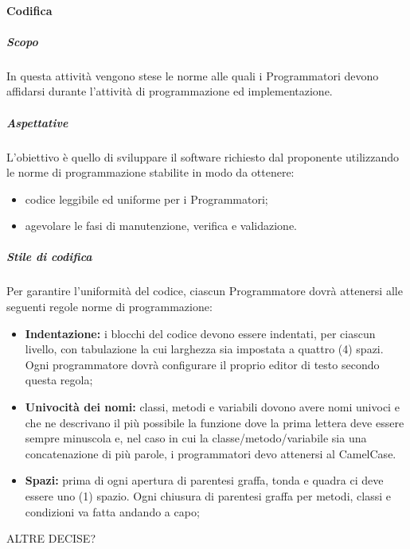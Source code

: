 			\paragraph{Codifica}
				\subparagraph{Scopo}	
					In questa attività vengono stese le norme alle quali i Programmatori devono affidarsi durante l’attività di  programmazione ed implementazione.
				\subparagraph{Aspettative}
					 L’obiettivo è quello di sviluppare il software richiesto dal proponente utilizzando le norme di programmazione stabilite in modo da ottenere:
					 	\begin{itemize}
					 	\item codice leggibile ed uniforme per i Programmatori;
					 	\item agevolare le fasi di manutenzione, verifica e validazione.
					 \end{itemize} 
				 \subparagraph{Stile di codifica}
				 	Per garantire l'uniformità del codice, ciascun Programmatore dovrà attenersi alle seguenti regole norme di programmazione: 
					\begin{itemize}
						\item \textbf{Indentazione:} i blocchi del codice devono essere indentati, per ciascun livello, con tabulazione la cui larghezza sia impostata a quattro (4) spazi. Ogni programmatore dovrà configurare il proprio editor di testo secondo questa regola;
						\item \textbf{Univocità dei nomi:} classi, metodi e variabili dovono avere nomi univoci e che ne descrivano il più possibile la funzione dove la prima lettera deve essere sempre minuscola e, nel caso in cui la classe/metodo/variabile sia una concatenazione di più parole, i programmatori devo attenersi al CamelCase.
						\item \textbf{Spazi:} prima di ogni apertura di parentesi graffa, tonda e quadra ci deve essere uno (1) spazio. Ogni chiusura di parentesi graffa per metodi, classi e condizioni va fatta andando a capo;
					\end{itemize}
					ALTRE DECISE?
					
				 
